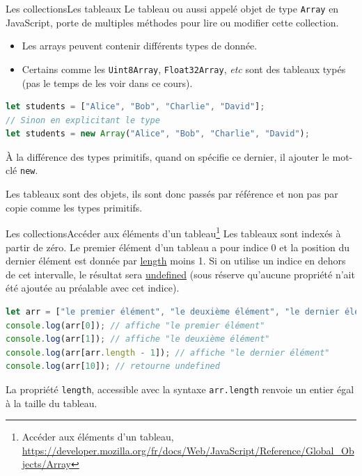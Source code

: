 \documentclass{beamer}
\begin{document}
    \begin{frame}[fragile]{Les collections}{Les tableaux}
        Le tableau ou aussi appelé objet de type \lstinline{Array} en JavaScript, porte de multiples méthodes pour lire ou modifier cette collection.
        \begin{itemize}
            \item Les arrays peuvent contenir différents types de donnée.
            \item Certains comme les \lstinline{Uint8Array}, \lstinline{Float32Array}, \textit{etc} sont des tableaux typés (pas le temps de les voir dans ce cours).
        \end{itemize}
        \begin{lstlisting}[language=JavaScript,title={\tiny{Script JavaScript}}]
let students = ["Alice", "Bob", "Charlie", "David"];
// Sinon en explicitant le type
let students = new Array("Alice", "Bob", "Charlie", "David");
        \end{lstlisting}
        \begin{dangercolorbox}
            À la différence des types primitifs, quand on spécifie ce dernier, il ajouter le mot-clé \lstinline{new}.

            Les tableaux sont des objets, ils sont donc passés par référence et non pas par copie comme les types primitifs.
        \end{dangercolorbox}
    \end{frame}

    \begin{frame}[fragile]{Les collections}{Accéder aux éléments d'un tableau\footnote{Accéder aux éléments d'un tableau, \url{https://developer.mozilla.org/fr/docs/Web/JavaScript/Reference/Global\_Objects/Array}}}
        Les tableaux sont indexés à partir de zéro.
        Le premier élément d'un tableau a pour indice 0 et la position du dernier élément est donnée par \href{https://developer.mozilla.org/fr/docs/Web/JavaScript/Reference/Global\_Objects/Array/length}{length} moins 1.
        Si on utilise un indice en dehors de cet intervalle, le résultat sera \href{https://developer.mozilla.org/fr/docs/Web/JavaScript/Reference/Global_Objects/undefined}{undefined} (sous réserve qu'aucune propriété n'ait été ajoutée au préalable avec cet indice).
        \begin{lstlisting}[language=JavaScript,title={\tiny{Script JavaScript}}]
let arr = ["le premier élément", "le deuxième élément", "le dernier élément"];
console.log(arr[0]); // affiche "le premier élément"
console.log(arr[1]); // affiche "le deuxième élément"
console.log(arr[arr.length - 1]); // affiche "le dernier élément"
console.log(arr[10]); // retourne undefined
        \end{lstlisting}
        La propriété \lstinline{length}, accessible avec la syntaxe \lstinline{arr.length} renvoie un entier égal à la taille du tableau.
    \end{frame}
\end{document}
